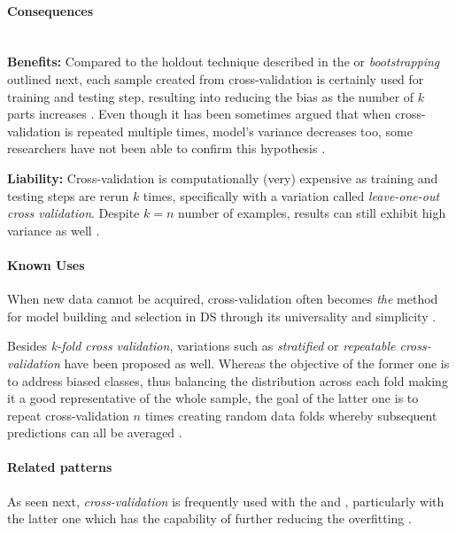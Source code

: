 \paragraph*{Consequences} ~\\
{\hspace*{14.5pt} \textbf{Benefits:} \hspace*{-5pt} }
Compared to the holdout technique described in the  or \emph{bootstrapping} outlined next, each sample created from cross-validation is certainly used for training and testing step, resulting into reducing the bias as the number of $k$ parts increases \parencite{Gutierrez-Osuna2002LECTURECross-validation}.
Even though it has been sometimes argued that when cross-validation is repeated multiple times, model's variance decreases too, some researchers have not been able to confirm this hypothesis \parencites{Vanwinckelen2012OnCross-validation}{Kohavi:1995:SCB:1643031.1643047}. 

\textbf{Liability:}
Cross-validation is computationally (very) expensive as training and testing steps are rerun $k$ times, specifically with a variation called \emph{leave-one-out cross validation}. 
Despite $k=n$ number of examples, results can still exhibit high variance as well \parencite{Gutierrez-Osuna2002LECTURECross-validation}.

\paragraph*{Known Uses}
\begin{compactitem}
  \item When new data cannot be acquired, cross-validation often becomes \emph{the} method for model building and selection in \ac{DS} through its universality and simplicity \parencites{arlot2010}{CVStandart2008}.
  \item Besides \emph{k-fold cross validation}, variations such as \emph{stratified} or \emph{repeatable cross-validation} have been proposed as well.
  Whereas the objective of the former one is to address biased classes, thus balancing the distribution across each fold making it a good representative of the whole sample, the goal of the latter one is to repeat cross-validation $n$ times creating random data folds whereby subsequent predictions can all be averaged \parencites{KuhnMax2013}{Vanwinckelen2012OnCross-validation}. 
\end{compactitem}

\paragraph*{Related patterns}
As seen next, \emph{cross-validation} is frequently used with the  and , particularly with the latter one which has the capability of further reducing the overfitting \parencite{NinaBookR2014}. 

